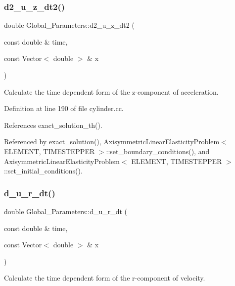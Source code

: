 \subsubsection{\texorpdfstring{d2\+\_\+u\+\_\+z\+\_\+dt2()}{d2\_u\_z\_dt2()}}
{\footnotesize\ttfamily double Global\+\_\+\+Parameters\+::d2\+\_\+u\+\_\+z\+\_\+dt2 (\begin{DoxyParamCaption}\item[{const double \&}]{time,  }\item[{const Vector$<$ double $>$ \&}]{x }\end{DoxyParamCaption})}



Calculate the time dependent form of the z-\/component of acceleration. 



Definition at line 190 of file cylinder.\+cc.



References exact\+\_\+solution\+\_\+th().



Referenced by exact\+\_\+solution(), Axisymmetric\+Linear\+Elasticity\+Problem$<$ E\+L\+E\+M\+E\+N\+T, T\+I\+M\+E\+S\+T\+E\+P\+P\+E\+R $>$\+::set\+\_\+boundary\+\_\+conditions(), and Axisymmetric\+Linear\+Elasticity\+Problem$<$ E\+L\+E\+M\+E\+N\+T, T\+I\+M\+E\+S\+T\+E\+P\+P\+E\+R $>$\+::set\+\_\+initial\+\_\+conditions().

\mbox{\label{namespaceGlobal__Parameters_aa587494218fe51b7d23a58009bf370f6}} 
\subsubsection{\texorpdfstring{d\+\_\+u\+\_\+r\+\_\+dt()}{d\_u\_r\_dt()}}
{\footnotesize\ttfamily double Global\+\_\+\+Parameters\+::d\+\_\+u\+\_\+r\+\_\+dt (\begin{DoxyParamCaption}\item[{const double \&}]{time,  }\item[{const Vector$<$ double $>$ \&}]{x }\end{DoxyParamCaption})}



Calculate the time dependent form of the r-\/component of velocity. 



